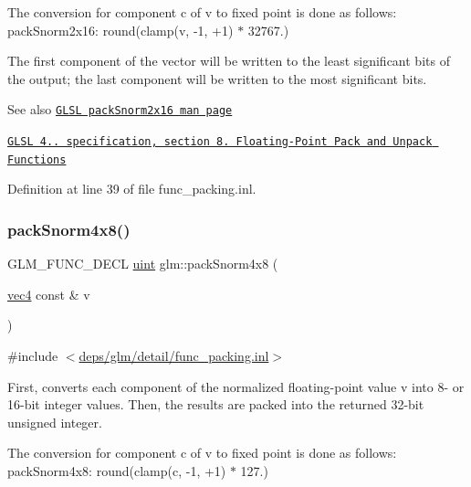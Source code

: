 The conversion for component c of v to fixed point is done as follows\+: pack\+Snorm2x16\+: round(clamp(v, -\/1, +1) $\ast$ 32767.)

The first component of the vector will be written to the least significant bits of the output; the last component will be written to the most significant bits.

\begin{DoxySeeAlso}{See also}
\href{http://www.opengl.org/sdk/docs/manglsl/xhtml/packSnorm2x16.xml}{\tt G\+L\+SL pack\+Snorm2x16 man page} 

\href{http://www.opengl.org/registry/doc/GLSLangSpec.4.20.8.pdf}{\tt G\+L\+SL 4.. specification, section 8. Floating-\/\+Point Pack and Unpack Functions} 
\end{DoxySeeAlso}


Definition at line 39 of file func\+\_\+packing.\+inl.

\mbox{\label{group__core__func__packing_ga85e8f17627516445026ab7a9c2e3531a}} 
\subsubsection{\texorpdfstring{pack\+Snorm4x8()}{packSnorm4x8()}}
{\footnotesize\ttfamily G\+L\+M\+\_\+\+F\+U\+N\+C\+\_\+\+D\+E\+CL \hyperlink{group__core__precision_ga4fd29415871152bfb5abd588334147c8}{uint} glm\+::pack\+Snorm4x8 (\begin{DoxyParamCaption}\item[{\hyperlink{group__core__types_ga5881b1b022d7fd1b7218f5916532dd02}{vec4} const \&}]{v }\end{DoxyParamCaption})}



{\ttfamily \#include $<$\hyperlink{func__packing_8inl}{deps/glm/detail/func\+\_\+packing.\+inl}$>$}

First, converts each component of the normalized floating-\/point value v into 8-\/ or 16-\/bit integer values. Then, the results are packed into the returned 32-\/bit unsigned integer.

The conversion for component c of v to fixed point is done as follows\+: pack\+Snorm4x8\+: round(clamp(c, -\/1, +1) $\ast$ 127.)

